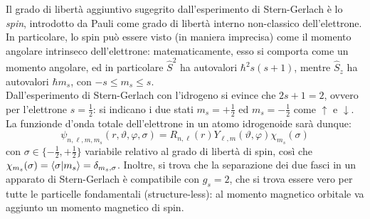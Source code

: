 Il grado di libertà aggiuntivo sugegrito dall'esperimento di Stern-Gerlach è lo \textit{spin}, introdotto da Pauli come grado di libertà interno non-classico dell'elettrone. In particolare, lo spin può essere visto (in maniera imprecisa) come il momento angolare intrinseco dell'elettrone: matematicamente, esso si comporta come un momento angolare, ed in particolare $ \hat{S}^2 $ ha autovalori $ \hbar^2 s(s+1) $, mentre $ \hat{S}_z $ ha autovalori $ \hbar m_s $, con $ -s \le m_s \le s $.\\
Dall'esperimento di Stern-Gerlach con l'idrogeno si evince che $ 2s + 1 = 2 $, ovvero per l'elettrone $ s = \frac{1}{2} $: si indicano i due stati $ m_s = + \frac{1}{2} $ ed $ m_s = - \frac{1}{2} $ come $ \uparrow $ e $ \downarrow $. La funzionde d'onda totale dell'elettrone in un atomo idrogenoide sarà dunque:
\begin{equation}
	\psi_{n,\ell,m,m_s}(r,\vartheta,\varphi,\sigma) = R_{n,\ell}(r) Y_{\ell,m}(\vartheta,\varphi) \chi_{m_s}(\sigma)
	\label{eq:1.11}
\end{equation}
con $ \sigma \in \{-\frac{1}{2} , +\frac{1}{2}\} $ variabile relativo al grado di libertà di spin, così che $ \chi_{m_s}(\sigma) = \braket{\sigma | m_s} = \delta_{m_s , \sigma} $. Inoltre, si trova che la separazione dei due fasci in un apparato di Stern-Gerlach è compatibile con $ g_s = 2 $, che si trova essere vero per tutte le particelle fondamentali (structure-less): al momento magnetico orbitale va aggiunto un momento magnetico di spin.

